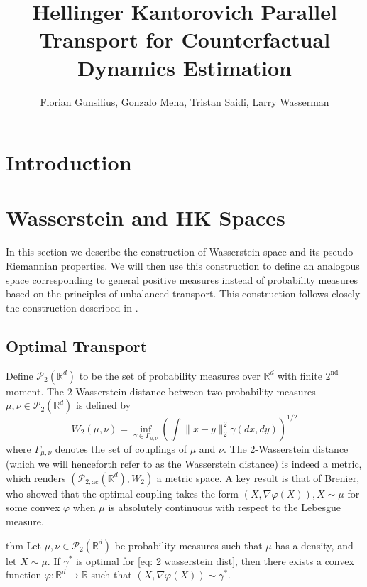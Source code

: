 \documentclass{article}
\title{Hellinger Kantorovich Parallel Transport for Counterfactual Dynamics Estimation}
\author{Florian Gunsilius, Gonzalo Mena, Tristan Saidi, Larry Wasserman}
\begin{document}
\maketitle


\section{Introduction}

\section{Wasserstein and HK Spaces}

In this section we describe the construction of Wasserstein space and its pseudo-Riemannian properties.  We will then use this construction to define an analogous space corresponding to general positive measures instead of probability measures based on the principles of unbalanced transport. This construction follows closely the construction described in \cite{clancy2021interpolating, chewi2024statisticaloptimaltransport, liero2018optimal, liero2016optimal, chizat2018interpolating, kondratyev2016newoptimaltransportdistance}.  

\subsection{Optimal Transport}
Define $\mathcal{P}_{2}(\mathbb{R}^d)$ to be the set of probability measures over $\mathbb{R}^d$ with finite $2^{\text{nd}}$ moment. The $2$-Wasserstein distance between two probability measures $\mu, \nu \in \mathcal{P}_{2}(\mathbb{R}^d)$ is defined by
\begin{equation}
    W_2(\mu, \nu) = \inf_{\gamma \in \Gamma_{\mu, \nu}}\left(\int\|x - y\|_2^2\gamma(dx, dy)\right)^{1/2} \label{eq: 2 wasserstein dist}
\end{equation}
where $\Gamma_{\mu, \nu}$ denotes the set of couplings of $\mu$ and $\nu$. The $2$-Wasserstein distance (which we will henceforth refer to as the Wasserstein distance) is indeed a metric, which renders $(\mathcal{P}_{2, \text{ac}}(\mathbb{R}^d), W_2)$ a metric space. A key result is that of Brenier, who showed that the optimal coupling takes the form $(X, \nabla \varphi(X)), X \sim \mu$ for some convex $\varphi$ when $\mu$ is absolutely continuous with respect to the Lebesgue measure.

\begin{restatable}[Brenier]{thm}{}
    Let $\mu, \nu \in \mathcal{P}_2(\mathbb{R}^d)$ be probability measures such that $\mu$ has a density, and let $X \sim \mu$. If $\gamma^*$ is optimal for \cref{eq: 2 wasserstein dist}, then there exists a convex function $\varphi:\mathbb{R}^d \rightarrow \mathbb{R}$ such that $(X, \nabla\varphi(X))\sim \gamma^*$. 
\end{restatable}
\end{document}
